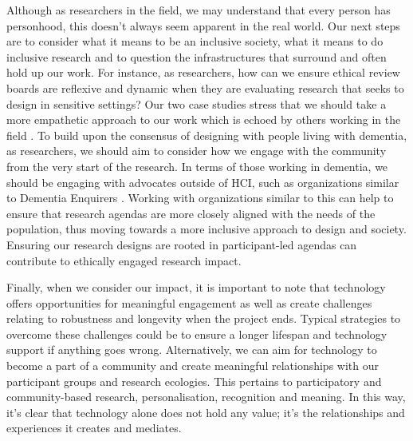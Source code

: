 Although as researchers in the field, we may understand that every person has personhood, this doesn't always seem apparent in the real world. Our next steps are to consider what it means to be an inclusive society, what it means to do inclusive research and to question the infrastructures that surround and often hold up our work. For instance, as researchers, how can we ensure ethical review boards are reflexive and dynamic when they are evaluating research that seeks to design in sensitive settings? Our two case studies stress that we should take a more empathetic approach to our work which is echoed by others working in the field \citep{foley_care_2019, welsh_ticket_2018, lazar_critical_2017, morrissey_care_2017, mccarthy_technology_2007,brankaert_dementia_2019}. To build upon the consensus of designing with people living with dementia, as researchers, we should aim to consider how we engage with the community from the very start of the research. In terms of those working in dementia, we should be engaging with advocates outside of HCI, such as organizations similar to Dementia Enquirers \citep{diaries_deep_2020}. Working with organizations similar to this can help to ensure that research agendas are more closely aligned with the needs of the population, thus moving towards a more inclusive approach to design and society. Ensuring our research designs are rooted in participant-led agendas can contribute to ethically engaged research impact. 

Finally, when we consider our impact, it is important to note that technology offers opportunities for meaningful engagement as well as create challenges relating to robustness and longevity when the project ends. Typical strategies to overcome these challenges could be to ensure a longer lifespan and technology support if anything goes wrong. Alternatively, we can aim for technology to become a part of a community and create meaningful relationships with our participant groups and research ecologies. This pertains to participatory and community-based research, personalisation, recognition and meaning. In this way, it's clear that technology alone does not hold any value; it's the relationships and experiences it creates and mediates.